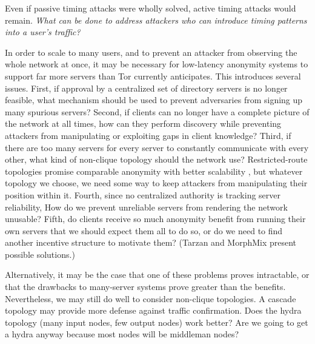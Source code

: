 \documentclass[times,10pt,twocolumn]{article}
\begin{document}
Even if passive timing attacks were wholly solved, active timing
attacks would remain.  \emph{What can
  be done to address attackers who can introduce timing patterns into
  a user's traffic?}  %

%

In order to scale to many users, and to prevent an
attacker from observing the whole network at once, it may be necessary
for low-latency anonymity systems to support far more servers than Tor
currently anticipates.  This introduces several issues.  First, if
approval by a centralized set of directory servers is no longer
feasible, what mechanism should be used to prevent adversaries from
signing up many spurious servers? 
Second, if clients can no longer have a complete
picture of the network at all times, how can they perform
discovery while preventing attackers from manipulating or exploiting
gaps in client knowledge?  Third, if there are too many servers
for every server to constantly communicate with every other, what kind
of non-clique topology should the network use?   Restricted-route
topologies promise comparable anonymity with better scalability
\cite{danezis-pets03}, but whatever topology we choose, we need some
way to keep attackers from manipulating their position within it.
Fourth, since no centralized authority is tracking server reliability,
How do we prevent unreliable servers from rendering the network
unusable?  Fifth, do clients receive so much anonymity benefit from
running their own servers that we should expect them all to do so, or
do we need to find another incentive structure to motivate them?
(Tarzan and MorphMix present possible solutions.)


Alternatively, it may be the case that one of these problems proves
intractable, or that the drawbacks to many-server systems prove
greater than the benefits.  Nevertheless, we may still do well to
consider non-clique topologies.  A cascade topology may provide more
defense against traffic confirmation.
%
Does the hydra topology (many input nodes, few output nodes) work
better? Are we going to get a hydra anyway because most nodes will be
middleman nodes?
\end{document}
